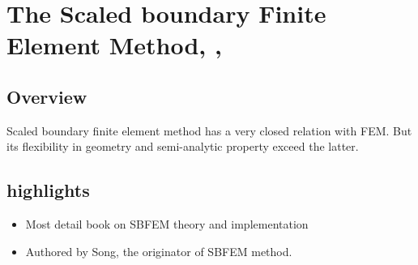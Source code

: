 
\section{The Scaled boundary Finite Element Method, \citeauthor{Song-2018-},  \cite{Song-2018-} }
\subsection{Overview}
Scaled boundary finite element method has a very closed relation with FEM. But its flexibility in geometry and semi-analytic property exceed the latter.
\subsection{highlights}
\begin{itemize}
	\item Most detail book on SBFEM theory and implementation
	\item Authored by Song, the originator of SBFEM method. 
\end{itemize}


